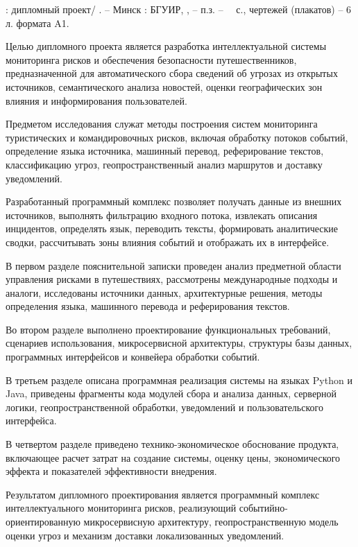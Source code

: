 \thispagestyle{empty}

\MakeUppercase{\topicName}: дипломный проект/ \fio. -- Минск : БГУИР, \the\year{}, -- п.з. -- ~\pageref*{LastPage}~с., чертежей (плакатов) -- 6 л. формата A1.

\vspace{4\parsep}


Целью дипломного проекта является разработка интеллектуальной системы мониторинга рисков и обеспечения безопасности путешественников, предназначенной для автоматического сбора сведений об угрозах из открытых источников, семантического анализа новостей, оценки географических зон влияния и информирования пользователей.

Предметом исследования служат методы построения систем мониторинга туристических и командировочных рисков, включая обработку потоков событий, определение языка источника, машинный перевод, реферирование текстов, классификацию угроз, геопространственный анализ маршрутов и доставку уведомлений.

Разработанный программный комплекс позволяет получать данные из внешних источников, выполнять фильтрацию входного потока, извлекать описания инцидентов, определять язык, переводить тексты, формировать аналитические сводки, рассчитывать зоны влияния событий и отображать их в интерфейсе.

В первом разделе пояснительной записки проведен анализ предметной области управления рисками в путешествиях, рассмотрены международные подходы и аналоги, исследованы источники данных, архитектурные решения, методы определения языка, машинного перевода и реферирования текстов.

Во втором разделе выполнено проектирование функциональных требований, сценариев использования, микросервисной архитектуры, структуры базы данных, программных интерфейсов и конвейера обработки событий.

В третьем разделе описана программная реализация системы на языках Python и Java, приведены фрагменты кода модулей сбора и анализа данных, серверной логики, геопространственной обработки, уведомлений и пользовательского интерфейса.

В четвертом разделе приведено технико-экономическое обоснование продукта, включающее расчет затрат на создание системы, оценку цены, экономического эффекта и показателей эффективности внедрения.

Результатом дипломного проектирования является программный комплекс интеллектуального мониторинга рисков, реализующий событийно-ориентированную микросервисную архитектуру, геопространственную модель оценки угроз и механизм доставки локализованных уведомлений.

\clearpage